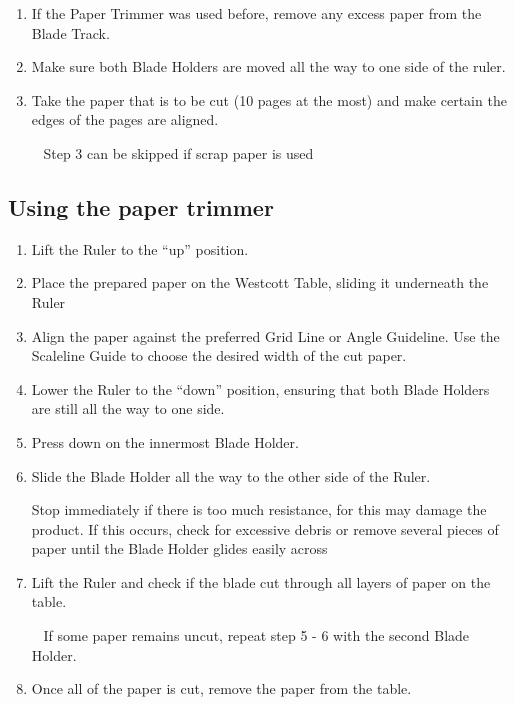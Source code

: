 \documentclass{article}
\newenvironment{important}[1][]{%
   \begin{mdframed}[%
      backgroundcolor={yellow!15}, hidealllines=true,
      skipabove=0.7\baselineskip, skipbelow=0.7\baselineskip,
      splitbottomskip=2pt, splittopskip=4pt, #1]%
   \makebox[0pt]{%
      \smash{%
         \fontsize{20pt}{20pt}\selectfont%
         \hspace*{-19pt}%
         \raisebox{5pt}{%
            {\color{yellow!100!white}\sffamily\bfseries Caution! }%
         }%
      }%
   }%
}{\end{mdframed}}
\newenvironment{note}[1][]{%
   \begin{mdframed}[%
      backgroundcolor={blue!15}, hidealllines=true,
      skipabove=0.7\baselineskip, skipbelow=0.7\baselineskip,
      splitbottomskip=2pt, splittopskip=4pt, #1]%
   \makebox[0pt]{%
      \smash{%
         \fontsize{20pt}{20pt}\selectfont%
         \hspace*{-19pt}%
         \raisebox{5pt}{%
            {\color{blue!100!white}\sffamily\bfseries Note: }%
         }%
      }%
   }%
}{\end{mdframed}}
\begin{document}
\begin{enumerate}

    \item If the Paper Trimmer was used before, remove any excess paper from the Blade Track.
    \item Make sure both Blade Holders are moved all the way to one side of the ruler.
    \item Take the paper that is to be cut (10 pages at the most) and make certain the edges of the pages are aligned.
    \ \newline
\begin{note}
    \ \newline
    Step 3 can be skipped if scrap paper is used
\end{note}
    
\end{enumerate}




\subsection{Using the paper trimmer}

\begin{enumerate}
    \item Lift the Ruler to the “up” position.
    \item Place the prepared paper on the Westcott Table, sliding it underneath the Ruler
    \item Align the paper against the preferred Grid Line or Angle Guideline. Use the Scaleline Guide to choose the desired width of the cut paper.
    \item Lower the Ruler to the “down” position, ensuring that both Blade Holders are still all the way to one side.
    \item Press down on the innermost Blade Holder.
    \item Slide the Blade Holder all the way to the other side of the Ruler.
    \ \newline
\begin{important}
\newline
 Stop immediately if there is too much resistance, for this may damage the product. If this occurs, check for excessive debris or remove several pieces of paper until the Blade Holder glides easily across
\end{important}
    
    \item Lift the Ruler and check if the blade cut through all layers of paper on the table.
    \ \newline
    \begin{note}
        \ \newline
        If some paper remains uncut, repeat step 5 - 6 with the second Blade Holder.
    \end{note}
    \item Once all of the paper is cut, remove the paper from the table.

\end{enumerate}
\end{document}
